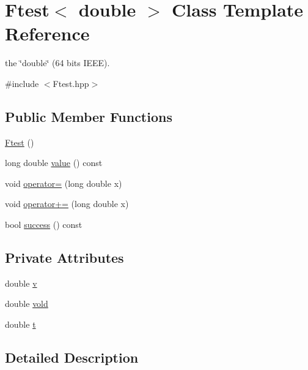 \hypertarget{classFtest_3_01double_01_4}{\section{Ftest$<$ double $>$ Class Template Reference}
\label{classFtest_3_01double_01_4}
}


the \char`\"{}double\char`\"{} (64 bits I\-E\-E\-E).  




{\ttfamily \#include $<$Ftest.\-hpp$>$}

\subsection*{Public Member Functions}
\begin{DoxyCompactItemize}
\item 
\hyperlink{classFtest_3_01double_01_4_a030f0a821103483dd6ec8f5634cfb9e5}{Ftest} ()
\item 
long double \hyperlink{classFtest_3_01double_01_4_ad8d62c57b982550f2a4536b928df7154}{value} () const 
\item 
void \hyperlink{classFtest_3_01double_01_4_aba4802114de8f06873bffed91b0a8299}{operator=} (long double x)
\item 
void \hyperlink{classFtest_3_01double_01_4_a7679165bc644bd4f654a5d21e7f4ddd7}{operator+=} (long double x)
\item 
bool \hyperlink{classFtest_3_01double_01_4_a0e40b39a5563dde092e0adfa6422b7fb}{success} () const 
\end{DoxyCompactItemize}
\subsection*{Private Attributes}
\begin{DoxyCompactItemize}
\item 
double \hyperlink{classFtest_3_01double_01_4_a84b03248da8cdd4377e470a2bb296708}{v}
\item 
double \hyperlink{classFtest_3_01double_01_4_acac842aa561735aaec7fba45014ca6c3}{vold}
\item 
double \hyperlink{classFtest_3_01double_01_4_ad34af7a6600b9d6680b311f632528589}{t}
\end{DoxyCompactItemize}


\subsection{Detailed Description}
